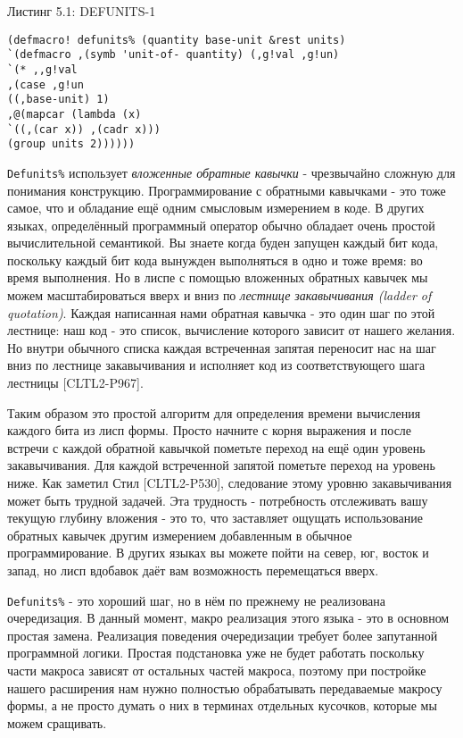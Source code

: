 Листинг 5.1: DEFUNITS-1\label{listing_5.1}
\listbegin
\begin{verbatim}
(defmacro! defunits% (quantity base-unit &rest units)
`(defmacro ,(symb 'unit-of- quantity) (,g!val ,g!un)
`(* ,,g!val
,(case ,g!un
((,base-unit) 1)
,@(mapcar (lambda (x)
`((,(car x)) ,(cadr x)))
(group units 2))))))
\end{verbatim}
\listend

\verb"Defunits%" использует \emph{вложенные обратные кавычки} - чрезвычайно сложную для понимания конструкцию. Программирование с обратными кавычками - это тоже самое, что и обладание ещё одним смысловым измерением в коде. В других языках, определённый программный оператор обычно обладает очень простой вычислительной семантикой. Вы знаете когда буден запущен каждый бит кода, поскольку каждый бит кода вынужден выполняться в одно и тоже время: во время выполнения. Но в лиспе с помощью вложенных обратных кавычек мы можем масштабироваться вверх и вниз по \emph{лестнице закавычивания (ladder of quotation)}. Каждая написанная нами обратная кавычка - это один шаг по этой лестнице: наш код - это список, вычисление которого зависит от нашего желания. Но внутри обычного списка каждая встреченная запятая переносит нас на шаг вниз по лестнице закавычивания и исполняет код из соответствующего шага лестницы [CLTL2-P967].

Таким образом это простой алгоритм для определения времени вычисления каждого бита из лисп формы. Просто начните с корня выражения и после встречи с каждой обратной кавычкой пометьте переход на ещё один уровень закавычивания. Для каждой встреченной запятой пометьте переход на уровень ниже. Как заметил Стил [CLTL2-P530], следование этому уровню закавычивания может быть трудной задачей. Эта трудность - потребность отслеживать вашу текущую глубину вложения - это то, что заставляет ощущать использование обратных кавычек другим измерением добавленным в обычное программирование. В других языках вы можете пойти на север, юг, восток и запад, но лисп вдобавок даёт вам возможность перемещаться вверх.

\verb"Defunits%" - это хороший шаг, но в нём по прежнему не реализована очередизация. В данный момент, макро реализация этого языка - это в основном простая замена. Реализация поведения очередизации требует более запутанной программной логики. Простая подстановка уже не будет работать поскольку части макроса зависят от остальных частей макроса, поэтому при постройке нашего расширения нам нужно полностью обрабатывать передаваемые макросу формы, а не просто думать о них в терминах отдельных кусочков, которые мы можем сращивать.

